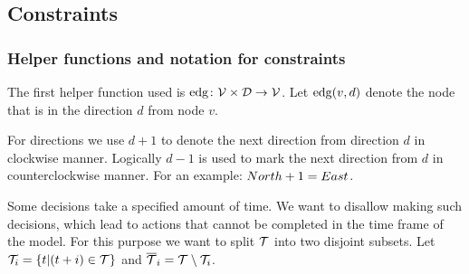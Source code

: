 \subsection{Constraints}
\subsubsection{Helper functions and notation for constraints}
\label{sec:helpers}
The first helper function used is $\mathrm{edg} \colon \mathcal{V} \times \mathcal{D} \to \mathcal{V}$. Let
$\mathrm{edg}(v,d)$ denote the node that is in the direction $d$ from node $v$.

For directions we use $d + 1$ to denote the next direction from direction $d$ in
clockwise manner. Logically $d - 1$ is used to mark the next direction from $d$
in counterclockwise manner. For an example: $North + 1 = East$.

Some decisions take a specified amount of time. We want to disallow making such
decisions, which lead to actions that cannot be completed in the time frame of
the model. For this purpose we want to split $\mathcal{T}$ into two disjoint subsets.
Let $\mathcal{T}_i = \{ t | (t+i) \in \mathcal{T}\}$ and $\overline{\mathcal{T}}_i = \mathcal{T} \setminus \mathcal{T}_i$.
